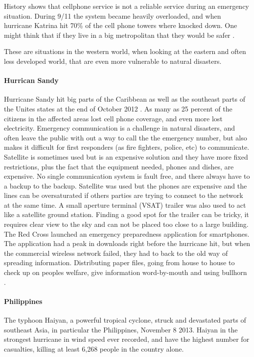 

History shows that cellphone service is not a reliable service during an emergency situation. During 9/11 the system became heavily overloaded, and when hurricane Katrina hit 70\% of the cell phone towers where knocked down. One might think that if they live in a big metropolitan that they would be safer \cite{disasterComm}. 

These are situations in the western world, when looking at the eastern and often less developed world, that are even more vulnerable to natural disasters. 



\paragraph{Hurrican Sandy}
Hurricane Sandy hit big parts of the Caribbean as well as the southeast parts of the Unites states at the end of October 2012 \cite{WikiSandy}. As many as 25 percent of the citizens in the affected areas lost cell phone coverage, and even more lost electricity. Emergency communication is a challenge in natural disasters, and often leave the public with out a way to call the the emergency number, but also makes it difficult for first responders (as fire fighters, police, etc) to communicate.  Satellite is sometimes used but is an expensive solution and they have more fixed restrictions, plus the fact that the equipment needed, phones and dishes, are expensive. No single communication system is fault free, and there always have to a backup to the backup. Satellite was used but the phones are expensive and the lines can be oversaturated if others parties are trying to connect to the network at the same time. A small aperture terminal (VSAT) trailer was also used to act like a satellite ground station. Finding a good spot for the trailer can be tricky, it requires clear view to the sky and can not be placed too close to a large building. The Red Cross launched an emergency preparedness application for smartphones. The application had a peak in downloads right before the hurricane hit, but when the commercial wireless network failed, they had to back to the old way of spreading information. Distributing paper files, going from house to house to check up on peoples welfare, give information word-by-mouth and using bullhorn \cite{hurricaneSandy}.

\paragraph{Philippines}
The typhoon Haiyan, a powerful tropical cyclone, struck and devastated parts of southeast Asia, in particular the Philippines, November 8 2013. Haiyan in the strongest hurricane in wind speed ever recorded, and have the highest number for casualties, killing at least 6,268 people in the country alone. \cite{wikiHaiyan} 


